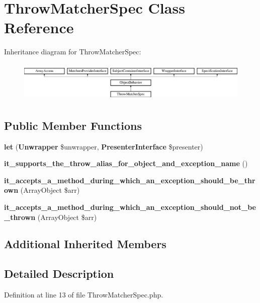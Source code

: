 \section{Throw\+Matcher\+Spec Class Reference}
\label{classspec_1_1_php_spec_1_1_matcher_1_1_throw_matcher_spec}
Inheritance diagram for Throw\+Matcher\+Spec\+:\begin{figure}[H]
\begin{center}
\leavevmode
\includegraphics[height=1.953488cm]{classspec_1_1_php_spec_1_1_matcher_1_1_throw_matcher_spec}
\end{center}
\end{figure}
\subsection*{Public Member Functions}
\begin{DoxyCompactItemize}
\item 
{\bf let} ({\bf Unwrapper} \$unwrapper, {\bf Presenter\+Interface} \$presenter)
\item 
{\bf it\+\_\+supports\+\_\+the\+\_\+throw\+\_\+alias\+\_\+for\+\_\+object\+\_\+and\+\_\+exception\+\_\+name} ()
\item 
{\bf it\+\_\+accepts\+\_\+a\+\_\+method\+\_\+during\+\_\+which\+\_\+an\+\_\+exception\+\_\+should\+\_\+be\+\_\+thrown} (Array\+Object \$arr)
\item 
{\bf it\+\_\+accepts\+\_\+a\+\_\+method\+\_\+during\+\_\+which\+\_\+an\+\_\+exception\+\_\+should\+\_\+not\+\_\+be\+\_\+thrown} (Array\+Object \$arr)
\end{DoxyCompactItemize}
\subsection*{Additional Inherited Members}


\subsection{Detailed Description}


Definition at line 13 of file Throw\+Matcher\+Spec.\+php.



